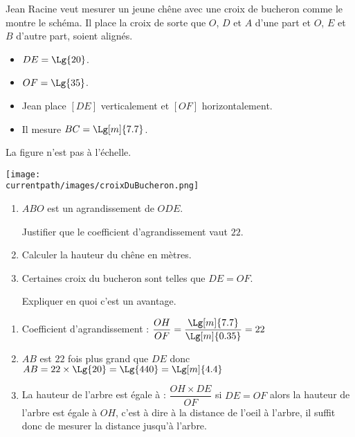 \begin{exercice*}
    Jean Racine veut mesurer un jeune chêne avec une croix de bucheron comme le montre le schéma.
    Il place la croix de sorte que $O$, $D$ et $A$ d'une part et $O$, $E$ et $B$ d'autre part, soient alignés.

    \begin{itemize}
        \item $DE = \Lg{20}$.
        \item $OF = \Lg{35}$.        
        \item Jean place $[DE]$ verticalement et $[OF]$ horizontalement.
        \item Il mesure $BC = \Lg[m]{7.7}$.
    \end{itemize}

    \begin{minipage}{1\linewidth}
    \begin{center}
        La figure n'est pas à l'échelle.

        \texttt{[image: \\currentpath/images/croixDuBucheron.png]}    
    \end{center}
    \end{minipage}    

    \begin{enumerate}
        \item $ABO$ est un agrandissement de $ODE$.
        
        Justifier que le coefficient d'agrandissement vaut $22$.
        \item Calculer la hauteur du chêne en mètres.
        \item Certaines croix du bucheron sont telles que $DE=OF$.
        
        Expliquer en quoi c'est un avantage.
    \end{enumerate}
\end{exercice*}
\begin{corrige}
    \begin{enumerate}
        \item Coefficient d'agrandissement : $\dfrac{OH}{OF}=\dfrac{\Lg[m]{7.7}}{\Lg[m]{0.35}}=22$
        \item $AB$ est $22$ fois plus grand que $DE$ donc $AB=22\times \Lg{20}=\Lg{440}=\Lg[m]{4.4}$
        \item La hauteur de l'arbre est égale à : $\dfrac{OH\times DE}{OF}$ si $DE=OF$ alors la hauteur de l'arbre
        est égale à $OH$, c'est à dire à la distance de l'oeil à l'arbre, il suffit donc de mesurer la distance jusqu'à l'arbre.
    \end{enumerate}
\end{corrige}



